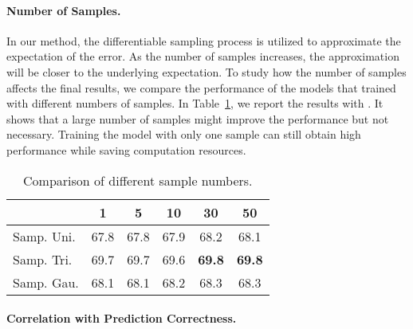 \documentclass{article}
\begin{document}
\paragraph{Number of Samples.} In our method, the differentiable sampling process is utilized to approximate the expectation of the error. As the number of samples increases, the approximation will be closer to the underlying expectation. To study how the number of samples affects the final results, we compare the performance of the models that trained with different numbers of samples. In Table~\ref{tab:sample_number}, we report the results with . It shows that a large number of samples might improve the performance but not necessary. Training the model with only one sample can still obtain high performance while saving computation resources.

\begin{table}[ht]
    \caption{Comparison of different sample numbers.}
    \label{tab:sample_number}
    \centering
    \begin{tabular}{lccccc}
        \toprule
         & 1 & 5 & 10 & 30 & 50 \\
        \midrule
        Samp. Uni. & 67.8 & 67.8 & 67.9 & 68.2 & 68.1 \\
        Samp. Tri. & 69.7 & 69.7 & 69.6 & \textbf{69.8} & \textbf{69.8} \\
        Samp. Gau. & 68.1 & 68.1 & 68.2 & 68.3 & 68.3 \\
        \bottomrule
    \end{tabular}
\end{table}

\paragraph{Correlation with Prediction Correctness.}
\end{document}
